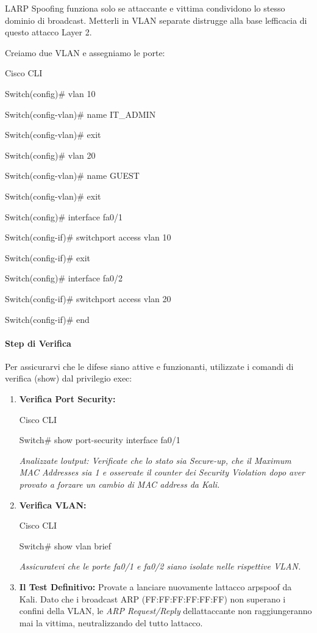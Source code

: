 \documentclass[11pt,a4paper]{article}
\begin{document}
L\textquotesingle ARP Spoofing funziona solo se attaccante e vittima
condividono lo stesso dominio di broadcast. Metterli in VLAN separate
distrugge alla base l\textquotesingle efficacia di questo attacco Layer
2.

Creiamo due VLAN e assegniamo le porte:

Cisco CLI

Switch(config)\# vlan 10

Switch(config-vlan)\# name IT\_ADMIN

Switch(config-vlan)\# exit

Switch(config)\# vlan 20

Switch(config-vlan)\# name GUEST

Switch(config-vlan)\# exit

Switch(config)\# interface fa0/1

Switch(config-if)\# switchport access vlan 10

Switch(config-if)\# exit

Switch(config)\# interface fa0/2

Switch(config-if)\# switchport access vlan 20

Switch(config-if)\# end

\paragraph{Step di Verifica}\label{step-di-verifica}

Per assicurarvi che le difese siano attive e funzionanti, utilizzate i
comandi di verifica (show) dal privilegio exec:

\begin{enumerate}
\def\labelenumi{\arabic{enumi}.}
\item
  \textbf{Verifica Port Security:}

  Cisco CLI

  Switch\# show port-security interface fa0/1

  \emph{Analizzate l\textquotesingle output: Verificate che lo stato sia
  Secure-up, che il Maximum MAC Addresses sia 1 e osservate il counter
  dei Security Violation dopo aver provato a forzare un cambio di MAC
  address da Kali.}
\item
  \textbf{Verifica VLAN:}

  Cisco CLI

  Switch\# show vlan brief

  \emph{Assicuratevi che le porte fa0/1 e fa0/2 siano isolate nelle
  rispettive VLAN.}
\item
  \textbf{Il Test Definitivo:} Provate a lanciare nuovamente
  l\textquotesingle attacco arpspoof da Kali. Dato che i broadcast ARP
  (FF:FF:FF:FF:FF:FF) non superano i confini della VLAN, le \emph{ARP
  Request/Reply} dell\textquotesingle attaccante non raggiungeranno mai
  la vittima, neutralizzando del tutto l\textquotesingle attacco.
\end{enumerate}
\end{document}
